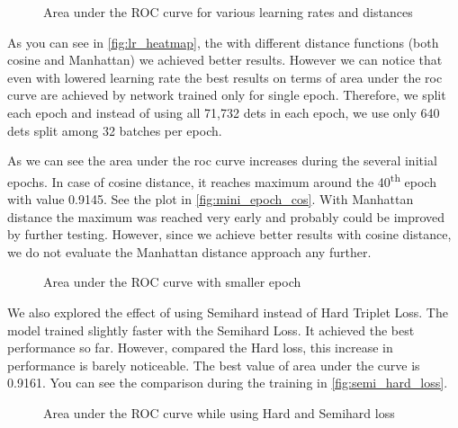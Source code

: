 \begin{figure}
    \centering
    \large
    \def\svgwidth{\columnwidth}
    \scalebox{0.8}{}
    \vspace{1cm}
    
    \def\svgwidth{\columnwidth}
    \scalebox{0.8}{}
    \caption{Area under the ROC curve for various learning rates and distances}
    \label{fig:lr_heatmap}
\end{figure}

As you can see in \autoref{fig:lr_heatmap}, the with different distance functions (both cosine and Manhattan) we achieved better results. However we can notice that even with lowered learning rate the best results on terms of area under the \gls{roc} curve are achieved by network trained only for single epoch. Therefore, we split each epoch and instead of using all 71,732 \glspl{det} in each epoch, we use only 640 \glspl{det} split among 32 batches per epoch.

As we can see the area under the \gls{roc} curve increases during the several initial epochs. In case of cosine distance, it reaches maximum around the 40\textsuperscript{th} epoch with value 0.9145. See the plot in \autoref{fig:mini_epoch_cos}. With Manhattan distance the maximum was reached very early and probably could be improved by further testing. However, since we achieve better results with cosine distance, we do not evaluate the Manhattan distance approach any further.

\begin{figure}
    \centering
    \def\svgwidth{\columnwidth}
    
    \caption{Area under the ROC curve with smaller epoch}
    \label{fig:mini_epoch_cos}
\end{figure}

We also explored the effect of using Semihard instead of Hard Triplet Loss. The model trained slightly faster with the Semihard Loss. It achieved the best performance so far. However, compared the Hard loss, this increase in performance is barely noticeable. The best value of area under the curve is 0.9161. You can see the comparison during the training in \autoref{fig:semi_hard_loss}.

\begin{figure}
    \centering
    \def\svgwidth{\columnwidth}
    
    \caption{Area under the ROC curve while using Hard and Semihard loss}
    \label{fig:semi_hard_loss}
\end{figure}

